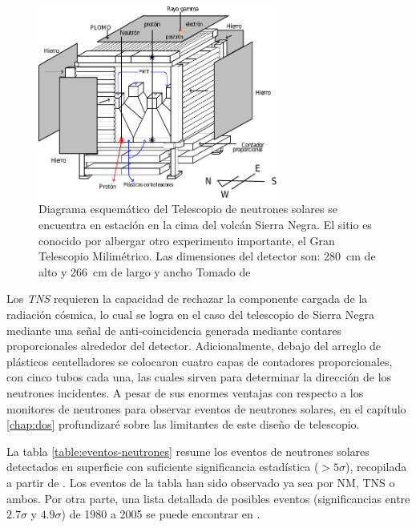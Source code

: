 \begin{figure}
        \centering
        \includegraphics[width=0.7\textwidth]{tns-mexico.pdf}
        \caption{Diagrama esquemático del Telescopio de neutrones solares se encuentra en estación en la cima del volcán Sierra Negra. El sitio es conocido por albergar otro experimento importante, el Gran Telescopio Milimétrico. Las dimensiones del detector son: \SI{280}{\centi\metre} de alto y \SI{266}{\centi\metre} de largo y ancho Tomado de \cite{barrantes18}}
        \label{fig:tns-mexico}
\end{figure}

Los \emph{TNS} requieren la capacidad de rechazar la componente cargada de la radiación cósmica, lo cual se logra en el caso del telescopio de Sierra Negra mediante una señal de anti-coincidencia generada mediante contares proporcionales alrededor del detector. Adicionalmente, debajo del arreglo de plásticos centelladores se colocaron cuatro capas de contadores proporcionales, con cinco tubos cada una, las cuales sirven para determinar la dirección de los neutrones incidentes. A pesar de sus enormes ventajas con respecto a los monitores de neutrones para observar eventos de neutrones solares, en el capítulo \ref{chap:dos} profundizaré sobre las limitantes de este diseño de telescopio.

La tabla \ref{table:eventos-neutrones} resume los eventos de neutrones solares detectados en superficie con suficiente significancia estadística ($>5\sigma$), recopilada a partir de \cite{watanabe05,sako06,muraki16}. Los eventos de la tabla han sido observado ya sea por NM, TNS o ambos. Por otra parte, una lista detallada de posibles eventos (significancias entre $2.7\sigma$ y $4.9\sigma$) de \num{1980} a \num{2005} se puede encontrar en \cite{mirosh15}.

